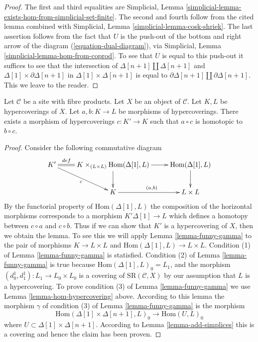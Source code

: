 \begin{proof}
The first and third equalities are
Simplicial, Lemma \ref{simplicial-lemma-exists-hom-from-simplicial-set-finite}.
The second and fourth follow from the cited lemma combined with
Simplicial, Lemma \ref{simplicial-lemma-cosk-shriek}.
The last assertion follows from the fact that
$U$ is the push-out of the bottom and right arrow of the
diagram (\ref{equation-dual-diagram}), via
Simplicial, Lemma \ref{simplicial-lemma-hom-from-coprod}.
To see that $U$ is equal to this push-out it suffices
to see that the intersection of
$\Delta[n + 1] \amalg \Delta[n + 1]$ and
$\Delta[1] \times \partial\Delta[n + 1]$
in $\Delta[1] \times \Delta[n + 1]$ is equal to
$\partial\Delta[n + 1] \amalg \partial\Delta[n + 1]$.
This we leave to the reader.
\end{proof}


\begin{lemma}
\label{lemma-homotopy}
Let $\mathcal{C}$ be a site with fibre products.
Let $X$ be an object of $\mathcal{C}$.
Let $K, L$ be hypercoverings of $X$.
Let $a, b : K \to L$ be morphisms of hypercoverings.
There exists a morphism of hypercoverings
$c : K' \to K$ such that $a \circ c$ is homotopic
to $b \circ c$.
\end{lemma}

\begin{proof}
Consider the following commutative diagram
$$
\xymatrix{
K' \ar@{=}[r]^-{def} \ar[rd]_c &
K \times_{(L \times L)} \text{Hom}(\Delta[1], L)
\ar[r] \ar[d] & \text{Hom}(\Delta[1], L) \ar[d] \\
& K \ar[r]^{(a, b)} & L \times L
}
$$
By the functorial property of $\text{Hom}(\Delta[1], L)$
the composition of the horizontal morphisms
corresponds to a morphism $K' \Delta[1] \to L$ which
defines a homotopy between $c \circ a$ and $c \circ b$.
Thus if we can show that $K'$ is a
hypercovering of $X$, then we obtain the lemma.
To see this we will apply Lemma \ref{lemma-funny-gamma}
to the pair of morphisms $K \to L \times L$
and $\text{Hom}(\Delta[1], L) \to L\times L$.
Condition (1) of Lemma \ref{lemma-funny-gamma} is statisfied.
Condition (2) of Lemma \ref{lemma-funny-gamma} is true because
$\text{Hom}(\Delta[1], L)_0 = L_1$, and the morphism
$(d^1_0, d^1_1) : L_1 \to L_0 \times L_0$ is a
covering of $\text{SR}(\mathcal{C}, X)$ by our
assumption that $L$ is a hypercovering.
To prove condition (3) of Lemma \ref{lemma-funny-gamma}
we use Lemma \ref{lemma-hom-hypercovering} above. According
to this lemma the morphism $\gamma$ of condition (3) of Lemma
\ref{lemma-funny-gamma} is the morphism
$$
\text{Hom}(\Delta[1] \times \Delta[n + 1], L)_0
\longrightarrow
\text{Hom}(U, L)_0
$$
where $U \subset \Delta[1] \times \Delta[n + 1]$.
According to Lemma \ref{lemma-add-simplices}
this is a covering and hence the claim has been proven.
\end{proof}

